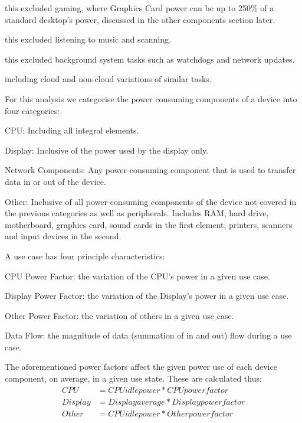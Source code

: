\documentclass[conference]{IEEEtran}
\begin{document}
 this excluded gaming, where Graphics Card power
can be up to 250\% of a standard desktop’s power, discussed in the
other components section later.

 this
excluded listening to music and scanning.

 this excluded background system tasks such as
watchdogs and network updates.

 including cloud
and non-cloud variations of similar tasks.

For this analysis we categorise the power consuming components of
a device into four categories:

\begin{compactitem}
\item CPU: Including all integral elements.
\item Display: Inclusive of the power used by the display only.
\item Network Components: Any power-consuming component that is used to transfer data in or out of the device.
\item Other: Inclusive of all power-consuming components
  of the device not covered in the previous categories as well as
  peripherals. Includes RAM, hard drive, motherboard, graphics
  card, sound cards in the first element; printers, scanners and input
  devices in the second.
\end{compactitem}

A use case has four principle characteristics:

\begin{compactitem}
\item CPU Power Factor: the variation of the CPU’s power in a given use case.
\item Display Power Factor: the variation of the Display’s power in a given use case.
\item Other Power Factor: the variation of others in a given use case.
\item Data Flow: the magnitude of data (summation of in and out) flow during a use case.
\end{compactitem}

The aforementioned power factors affect the given power use of each
device component, on average, in a given use state. These are
calculated thus:
\begin{align*}
CPU &= CPU idle power * CPU power factor\\
Display &= Display average * Display power factor\\
Other &= CPU idle power * Other power factor
\end{align*}
\end{document}
